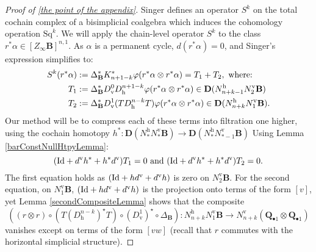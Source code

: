 \documentclass[11pt]{amsart} \renewcommand{\baselinestretch}{1.4}
\theoremstyle{plain}
\theoremstyle{definition}
\let\oldphi\phi
\let\phi\varphi
\renewcommand{\to}{\longrightarrow}
\newcommand{\DeltatubfD}{\Delta_{\mathrm{\textbf{B}}}}
\newcommand{\citeBOX}[2][]{\cite[\mbox{#1}]{#2}}
\newcommand{\Sq}{\mathrm{Sq}}
\newcommand{\EZ}[5]{[Z^{#1}_{#2}#3]^{#4}_{#5}}
\newcommand{\uver}{^\mathrm{v}}
\newcommand{\uhor}{^\mathrm{h}}
\newcommand{\dver}{_\mathrm{v}}
\newcommand{\dhor}{_\mathrm{h}}
\newcommand{\dual}{\mathbf{D}}
\begin{document}
\begin{appendices}
\begin{proof}[Proof of \ref{the point of the appendix}]
Singer \citeBOX[(2.14)]{MR2245560} defines  an operator $S^k$ on the total cochain complex of a bisimplicial coalgebra which induces the cohomology operation $\Sq^k$.
We will apply the chain-level operator $S^k$  to the class $r^*\alpha\in \EZ{}{\infty}{\textbf{B}}{n,1}{}$. As $\alpha$ is a permanent cycle, $d(r^*\alpha)=0$, and Singer's expression simplifies to:
\begin{alignat*}{2}
S^k(r^*\alpha):={}&\DeltatubfD^*K^*_{n+1-k}\oldphi(r^*\alpha\otimes r^*\alpha)=T_1+T_2,\textup{ where:}
\\
T_1
:={}&
\DeltatubfD^*D\dver^0D\dhor^{n+1-k}
\oldphi(r^*\alpha\otimes r^*\alpha)\in \dual(N\uhor_{n+k-1}N\uver_2\textbf{B})%
\\
T_2
:={}&
\DeltatubfD^*D\dver^1(TD\dhor^{n-k}T)
\oldphi(r^*\alpha\otimes r^*\alpha)\in \dual(N\uhor_{n+k}N\uver_1\textbf{B}).
\end{alignat*}
%
Our method will be to compress each of these terms into filtration one higher, using the cochain homotopy $h^*:\dual(N\uhor_* N\uver_*\textbf{B})\to \dual(N\uhor_*N\uver_{*-1}\textbf{B})$
Using Lemma \ref{barConstNullHtpyLemma}:
\[(\textup{Id}+d\uver h^*+ h^*d\uver )T_1=0\textup{ and }(\textup{Id}+d\uver h^*+ h^*d\uver)T_2=0.\]
The first equation holds as $(\textup{Id}+hd\uver+d\uver h)$ is zero on $N\uver_2\textbf{B}$. For the second equation, on $N\uver_1\textbf{B}$,  $(\textup{Id}+hd\uver+d\uver h)$ is the projection onto terms of the form $[v]$, yet Lemma \ref{secondCompositeLemma} shows that the composite
\[((r\otimes r)\circ(T(D\dhor^{n-k})^\star T)\circ (D\dver^1)^\star\circ\DeltatubfD): N\uhor_{n+k}N\uver_1\textbf{B}\to N\uver_{n+k}(\textbf{Q}_{\bullet1}\otimes \textbf{Q}_{\bullet1})\]
vanishes except on terms of the form $[vw]$ (recall that $r$ commutes with the horizontal simplicial structure).


\end{proof}
\end{appendices}
\end{document}
